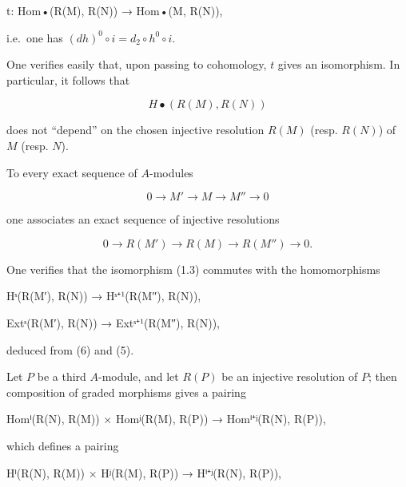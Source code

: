 \documentclass[
  11pt,
  a4paper,
]{book}
\newenvironment{Shaded}{}{}
\newcommand{\NormalTok}[1]{#1}
\begin{document}
\begin{Shaded}
\begin{Highlighting}[]
\NormalTok{t: Hom•(R(M), R(N)) → Hom•(M, R(N)),}
\end{Highlighting}
\end{Shaded}

i.e.~one has \((dh)^{0} \circ i = d_{2} \circ h^{0} \circ i\).

One verifies easily that, upon passing to cohomology, \(t\) gives an
isomorphism. In particular, it follows that

\[ H\bullet(R(M), R(N)) \]

does not ``depend'' on the chosen injective resolution \(R(M)\) (resp.
\(R(N)\)) of \(M\) (resp. \(N\)).

To every exact sequence of \(A\)-modules

\[ 0 \to M' \to M \to M'' \to 0 \]

one associates an exact sequence of injective resolutions

\[ 0 \to R(M') \to R(M) \to R(M'') \to 0. \]

One verifies that the isomorphism (1.3) commutes with the homomorphisms

\begin{Shaded}
\begin{Highlighting}[]
\NormalTok{Hˢ(R(M′), R(N)) → Hˢ⁺¹(R(M″), R(N)),}
\end{Highlighting}
\end{Shaded}

\begin{Shaded}
\begin{Highlighting}[]
\NormalTok{Extˢ(R(M′), R(N)) → Extˢ⁺¹(R(M″), R(N)),}
\end{Highlighting}
\end{Shaded}

deduced from (6) and (5).

Let \(P\) be a third \(A\)-module, and let \(R(P)\) be an injective
resolution of \(P\); then composition of graded morphisms gives a
pairing

\begin{Shaded}
\begin{Highlighting}[]
\NormalTok{Homⁱ(R(N), R(M)) × Homʲ(R(M), R(P)) → Homⁱ⁺ʲ(R(N), R(P)),}
\end{Highlighting}
\end{Shaded}

which defines a pairing

\begin{Shaded}
\begin{Highlighting}[]
\NormalTok{Hⁱ(R(N), R(M)) × Hʲ(R(M), R(P)) → Hⁱ⁺ʲ(R(N), R(P)),}
\end{Highlighting}
\end{Shaded}
\end{document}
